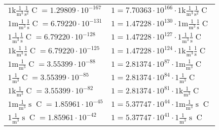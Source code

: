 \begin{center}
\begin{longtable}{l l}
{\color{gray}$1 \bm{\mathrm{ k}}\frac1{\operatorname{m}^3}\frac1{\operatorname{s}^2}{\operatorname{C}}{} = 1.29809\cdot10^{-167} $}   & {\color{gray}$ 1 = 7.70363\cdot10^{166} \cdot 1 \bm{\mathrm{ k}}\frac1{\operatorname{m}^3}\frac1{\operatorname{s}^2}{\operatorname{C}}{}$}  \\
{\color{gray}$1 \bm{\mathrm{ m}}\frac1{\operatorname{m}^3}\frac1{\operatorname{s}}{\operatorname{C}}{} = 6.79220\cdot10^{-131} $}   & {\color{gray}$ 1 = 1.47228\cdot10^{130} \cdot 1 \bm{\mathrm{ m}}\frac1{\operatorname{m}^3}\frac1{\operatorname{s}}{\operatorname{C}}{}$}  \\
{\color{black}$1 \bm{\mathrm{ }}\frac1{\operatorname{m}^3}\frac1{\operatorname{s}}{\operatorname{C}}{} = 6.79220\cdot10^{-128} $}   & {\color{black}$ 1 = 1.47228\cdot10^{127} \cdot 1 \bm{\mathrm{ }}\frac1{\operatorname{m}^3}\frac1{\operatorname{s}}{\operatorname{C}}{}$}  \\
{\color{gray}$1 \bm{\mathrm{ k}}\frac1{\operatorname{m}^3}\frac1{\operatorname{s}}{\operatorname{C}}{} = 6.79220\cdot10^{-125} $}   & {\color{gray}$ 1 = 1.47228\cdot10^{124} \cdot 1 \bm{\mathrm{ k}}\frac1{\operatorname{m}^3}\frac1{\operatorname{s}}{\operatorname{C}}{}$}  \\
{\color{gray}$1 \bm{\mathrm{ m}}\frac1{\operatorname{m}^3}{}{\operatorname{C}}{} = 3.55399\cdot10^{-88} $}   & {\color{gray}$ 1 = 2.81374\cdot10^{87} \cdot 1 \bm{\mathrm{ m}}\frac1{\operatorname{m}^3}{}{\operatorname{C}}{}$}  \\
{\color{black}$1 \bm{\mathrm{ }}\frac1{\operatorname{m}^3}{}{\operatorname{C}}{} = 3.55399\cdot10^{-85} $}   & {\color{black}$ 1 = 2.81374\cdot10^{84} \cdot 1 \bm{\mathrm{ }}\frac1{\operatorname{m}^3}{}{\operatorname{C}}{}$}  \\
{\color{gray}$1 \bm{\mathrm{ k}}\frac1{\operatorname{m}^3}{}{\operatorname{C}}{} = 3.55399\cdot10^{-82} $}   & {\color{gray}$ 1 = 2.81374\cdot10^{81} \cdot 1 \bm{\mathrm{ k}}\frac1{\operatorname{m}^3}{}{\operatorname{C}}{}$}  \\
{\color{gray}$1 \bm{\mathrm{ m}}\frac1{\operatorname{m}^3}{\operatorname{s}}{\operatorname{C}}{} = 1.85961\cdot10^{-45} $}   & {\color{gray}$ 1 = 5.37747\cdot10^{44} \cdot 1 \bm{\mathrm{ m}}\frac1{\operatorname{m}^3}{\operatorname{s}}{\operatorname{C}}{}$}  \\
{\color{black}$1 \bm{\mathrm{ }}\frac1{\operatorname{m}^3}{\operatorname{s}}{\operatorname{C}}{} = 1.85961\cdot10^{-42} $}   & {\color{black}$ 1 = 5.37747\cdot10^{41} \cdot 1 \bm{\mathrm{ }}\frac1{\operatorname{m}^3}{\operatorname{s}}{\operatorname{C}}{}$}  \\

\end{longtable}
\end{center}
